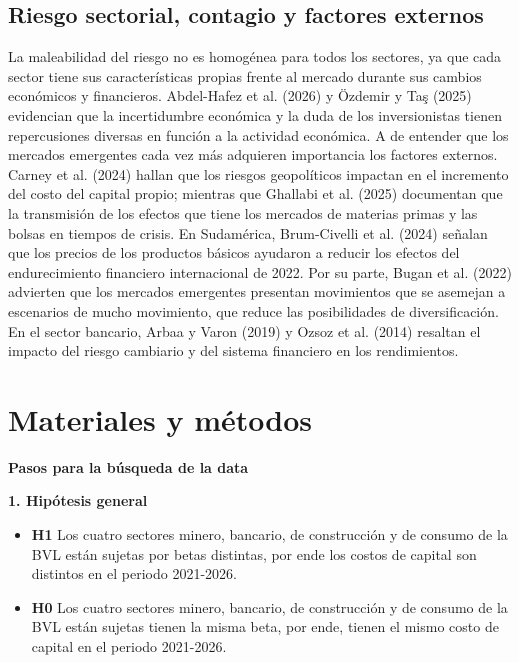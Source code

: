 \documentclass[12pt]{article}
\begin{document}
\subsection{Riesgo sectorial, contagio y factores externos}
La maleabilidad del riesgo no es homogénea para todos los sectores, ya que cada sector tiene sus características propias frente al mercado durante sus cambios económicos y financieros. Abdel-Hafez et al. (2026) y Özdemir y Taş (2025) evidencian que la incertidumbre económica y la duda de los inversionistas tienen repercusiones diversas en función a la actividad económica. A de entender que los mercados emergentes cada vez más adquieren importancia los factores externos. Carney et al. (2024) hallan que los riesgos geopolíticos impactan en el incremento del costo del capital propio; mientras que Ghallabi et al. (2025) documentan que la transmisión de los efectos que tiene los mercados de materias primas y las bolsas en tiempos de crisis. En Sudamérica, Brum-Civelli et al. (2024) señalan que los precios de los productos básicos ayudaron a reducir los efectos del endurecimiento financiero internacional de 2022. Por su parte, Bugan et al. (2022) advierten que los mercados emergentes presentan movimientos que se asemejan a escenarios de mucho movimiento, que reduce las posibilidades de diversificación. En el sector bancario, Arbaa y Varon (2019) y Ozsoz et al. (2014) resaltan el impacto del riesgo cambiario y del sistema financiero en los rendimientos.


\section{Materiales y métodos}
\noindent\textbf{Pasos para la búsqueda de la data}

\noindent\textbf{1. Hipótesis general}
\begin{itemize}
\item \textbf{H1} Los cuatro sectores minero, bancario, de construcción y de consumo de la BVL están sujetas por betas distintas, por ende los costos de capital  son distintos en el periodo 2021-2026.
\item \textbf{H0} Los cuatro sectores minero, bancario, de construcción y de consumo de la BVL están sujetas tienen la misma beta, por ende, tienen el mismo costo de capital en el periodo 2021-2026.
\end{itemize}
\end{document}
